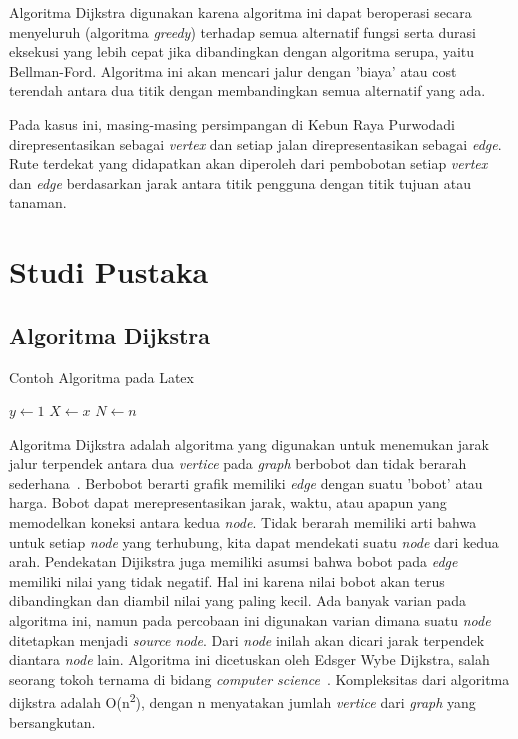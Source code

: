 \documentclass[conference]{IEEEtran}
\begin{document}
Algoritma Dijkstra digunakan karena algoritma ini dapat beroperasi secara menyeluruh (algoritma \textit{greedy}) terhadap semua alternatif fungsi serta durasi eksekusi yang lebih cepat jika dibandingkan dengan algoritma serupa, yaitu Bellman-Ford. Algoritma ini akan mencari jalur dengan ’biaya’ atau cost terendah antara dua titik dengan membandingkan semua alternatif yang ada.

Pada kasus ini, masing-masing persimpangan di Kebun Raya Purwodadi direpresentasikan sebagai \textit{vertex} dan setiap jalan direpresentasikan sebagai \textit{edge}. Rute terdekat yang didapatkan akan diperoleh dari pembobotan setiap \textit{vertex} dan \textit{edge} berdasarkan jarak antara titik pengguna dengan titik tujuan atau tanaman.

\section{Studi Pustaka}
\subsection{Algoritma Dijkstra}
\begin{algorithm}
    \caption{Contoh Algoritma pada Latex}
    $y \gets 1$\;
    $X \gets x$\;
    $N \gets n$\;
    \end{algorithm}
Algoritma Dijkstra adalah algoritma yang digunakan untuk menemukan jarak jalur terpendek antara dua \textit{vertice} pada \textit{graph} berbobot dan tidak berarah sederhana~\cite{rosen2011discrete}. Berbobot berarti grafik memiliki \textit{edge} dengan suatu ’bobot’ atau harga. Bobot dapat merepresentasikan jarak, waktu, atau apapun yang memodelkan koneksi antara kedua \textit{node}. 
Tidak berarah memiliki arti bahwa untuk setiap \textit{node} yang terhubung, kita dapat mendekati suatu \textit{node} dari kedua arah. Pendekatan Dijikstra juga memiliki asumsi bahwa bobot pada \textit{edge} memiliki nilai yang tidak negatif. Hal ini karena nilai bobot akan terus dibandingkan dan diambil nilai yang paling kecil. Ada banyak varian pada algoritma ini, namun pada percobaan 
ini digunakan varian dimana suatu \textit{node} ditetapkan menjadi \textit{source} \textit{node}. Dari \textit{node} inilah akan dicari jarak terpendek diantara \textit{node} lain. Algoritma ini dicetuskan oleh Edsger Wybe Dijkstra, salah seorang tokoh ternama di bidang \textit{computer science}~\cite{dijkstra1959note}. Kompleksitas dari algoritma dijkstra adalah O(n\textsuperscript{2}), dengan n menyatakan jumlah \textit{vertice} dari \textit{graph} yang bersangkutan.
\end{document}
